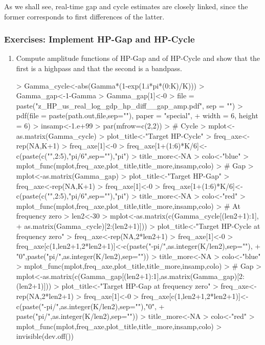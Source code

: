 \documentclass[a4paper]{book}
\begin{document}
As we shall see, real-time gap and cycle estimates are closely linked, since the former corresponds to first differences of the latter. 


\subsubsection{Exercises: Implement HP-Gap and HP-Cycle}

\begin{enumerate}
\item Compute amplitude functions of HP-Gap and of HP-Cycle  and show that the first is a highpass and that the second is a bandpass. 
\begin{Schunk}
\begin{Sinput}
> Gamma_cycle<-abs(Gamma*(1-exp(1.i*pi*(0:K)/K)))
> Gamma_gap<-1-Gamma
> Gamma_gap[1]<-0
> file = paste("z_HP_us_real_log_gdp_hp_diff__gap_amp.pdf", sep = "")
> pdf(file = paste(path.out,file,sep=""), paper = "special", 
+     width = 6, height = 6)
> insamp<-1.e+99
> par(mfrow=c(2,2))
> # Cycle
> mplot<-as.matrix(Gamma_cycle)
> plot_title<-"Target HP-Cycle"
> freq_axe<-rep(NA,K+1)
> freq_axe[1]<-0
> freq_axe[1+(1:6)*K/6]<-c(paste(c("",2:5),"pi/6",sep=""),"pi")
> title_more<-NA
> colo<-"blue"
> mplot_func(mplot,freq_axe,plot_title,title_more,insamp,colo)
> # Gap
> mplot<-as.matrix(Gamma_gap)
> plot_title<-"Target HP-Gap"
> freq_axe<-rep(NA,K+1)
> freq_axe[1]<-0
> freq_axe[1+(1:6)*K/6]<-c(paste(c("",2:5),"pi/6",sep=""),"pi")
> title_more<-NA
> colo<-"red"
> mplot_func(mplot,freq_axe,plot_title,title_more,insamp,colo)
> # At frequency zero
> len2<-30
> mplot<-as.matrix(c(Gamma_cycle[(len2+1):1],
+                    as.matrix(Gamma_cycle)[2:(len2+1)]))
> plot_title<-"Target HP-Cycle at frequency zero"
> freq_axe<-rep(NA,2*len2+1)
> freq_axe[1]<-0
> freq_axe[c(1,len2+1,2*len2+1)]<-c(paste("-pi/",as.integer(K/len2),sep=""),
+                               "0",paste("pi/",as.integer(K/len2),sep=""))
> title_more<-NA
> colo<-"blue"
> mplot_func(mplot,freq_axe,plot_title,title_more,insamp,colo)
> # Gap
> mplot<-as.matrix(c(Gamma_gap[(len2+1):1],as.matrix(Gamma_gap)[2:(len2+1)]))
> plot_title<-"Target HP-Gap at frequency zero"
> freq_axe<-rep(NA,2*len2+1)
> freq_axe[1]<-0
> freq_axe[c(1,len2+1,2*len2+1)]<-c(paste("-pi/",as.integer(K/len2),sep=""),"0",
+                                   paste("pi/",as.integer(K/len2),sep=""))
> title_more<-NA
> colo<-"red"
> mplot_func(mplot,freq_axe,plot_title,title_more,insamp,colo)
> invisible(dev.off())
\end{Sinput}
\end{Schunk}

\end{enumerate}
\end{document}

